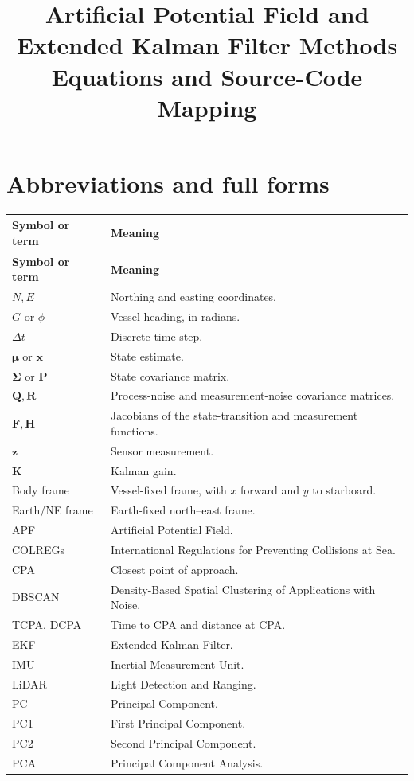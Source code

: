 \documentclass[11pt,a4paper]{article}
\title{\textbf{Artificial Potential Field and Extended Kalman Filter Methods}\\[4pt]
\large Equations and Source-Code Mapping}
\author{}
\date{}
\begin{document}
\maketitle
\tableofcontents
\newpage

\section*{Abbreviations and full forms}

\begin{longtable}{>{\raggedright\arraybackslash}p{}p{}}
\toprule
\textbf{Symbol or term} & \textbf{Meaning} \\
\midrule
\endfirsthead
\toprule
\textbf{Symbol or term} & \textbf{Meaning} \\
\midrule
\endhead
$N,E$ & Northing and easting coordinates. \\
$G$ or $\phi$ & Vessel heading, in radians. \\
$\Delta t$ & Discrete time step. \\
$\bm{\mu}$ or $\bm{x}$ & State estimate. \\
$\bm{\Sigma}$ or $\bm{P}$ & State covariance matrix. \\
$\bm{Q},\bm{R}$ & Process-noise and measurement-noise covariance matrices. \\
$\bm{F},\bm{H}$ & Jacobians of the state-transition and measurement functions. \\
$\bm{z}$ & Sensor measurement. \\
$\bm{K}$ & Kalman gain. \\
Body frame & Vessel-fixed frame, with $x$ forward and $y$ to starboard. \\
Earth/NE frame & Earth-fixed north--east frame. \\
APF & Artificial Potential Field. \\
COLREGs & International Regulations for Preventing Collisions at Sea. \\
CPA & Closest point of approach. \\
DBSCAN & Density-Based Spatial Clustering of Applications with Noise. \\
TCPA, DCPA & Time to CPA and distance at CPA. \\
EKF & Extended Kalman Filter. \\
IMU & Inertial Measurement Unit. \\
LiDAR & Light Detection and Ranging. \\
PC & Principal Component. \\
PC1 & First Principal Component. \\
PC2 & Second Principal Component. \\
PCA & Principal Component Analysis. \\
\bottomrule
\end{longtable}
\end{document}

